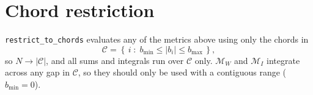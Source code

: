 \documentclass[11pt]{article}
\begin{document}
\section*{Chord restriction}

\texttt{restrict\_to\_chords} evaluates any of the metrics above using only the chords in
\begin{equation}
  \mathcal{C} = \left\{\, i \;:\; b_{\min} \le |b_i| \le b_{\max} \,\right\},
\end{equation}
so $N \to |\mathcal{C}|$, and all sums and integrals run over $\mathcal{C}$ only.
$\mathcal{M}_W$ and $\mathcal{M}_I$ integrate across any gap in $\mathcal{C}$, so they should
only be used with a contiguous range ($b_{\min} = 0$).
\end{document}
